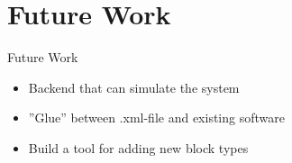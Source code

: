 \documentclass{beamer}
\begin{document}
\section{Future Work}
\begin{frame}{Future Work}
	\begin{itemize}
		\item<2-> Backend that can simulate the system
		\item<3-> ''Glue'' between .xml-file and existing software
		\item<4-> Build a tool for adding new block types
	\end{itemize}
\end{frame}
\end{document}
